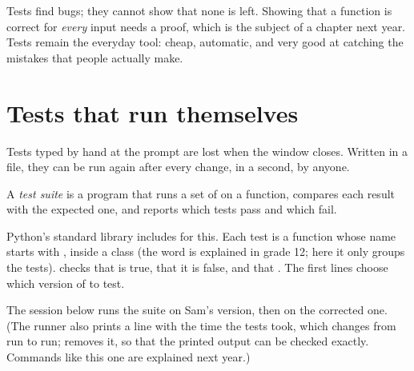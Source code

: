 Tests find bugs; they cannot show that none is left. Showing that a function is correct for \emph{every} input
needs a proof, which is the subject of a chapter next year. Tests remain the everyday tool: cheap, automatic, and
very good at catching the mistakes that people actually make.

\section{Tests that run themselves}\label{sec:g10:specifications-and-tests:automatic}

Tests typed by hand at the prompt are lost when the window closes. Written in a file, they can be run again after
every change, in a second, by anyone.

\begin{definition}\label{def:g10:specifications-and-tests:test-suite}
A \emph{test suite} is a program that runs a set of  on a function, compares each
result with the expected one, and reports which tests pass and which fail.
\end{definition}

Python's standard library includes  for this. Each test is a function whose name starts with
, inside a class (the word  is explained in grade 12; here it only groups the tests).
 checks that  is true,  that it is false, and
 that . The first lines choose which version of  to test.

\label{lst:g10:specifications-and-tests:suite}

The session below runs the suite on Sam's version, then on the corrected one. (The runner also prints a line
with the time the tests took, which changes from run to run;  removes it, so that the printed output
can be checked exactly. Commands like this one are explained next year.)

\label{out:g10:specifications-and-tests:run-tests}


